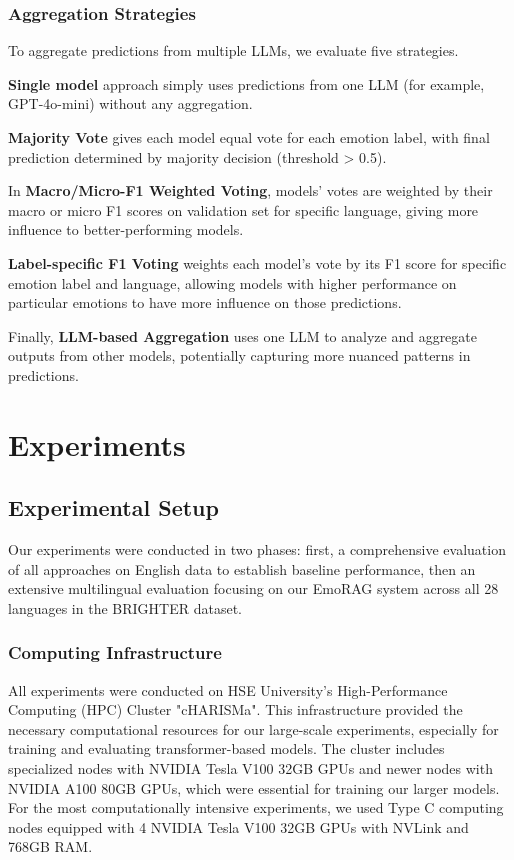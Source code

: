 \documentclass[a4paper,12pt]{extarticle}
\begin{document}
\subsubsection{Aggregation Strategies}

To aggregate predictions from multiple LLMs, we evaluate five strategies. 

\textbf{Single model} approach simply uses predictions from one LLM (for example, GPT-4o-mini) without any aggregation. 

\textbf{Majority Vote} gives each model equal vote for each emotion label, with final prediction determined by majority decision (threshold > 0.5). 

In \textbf{Macro/Micro-F1 Weighted Voting}, models' votes are weighted by their macro or micro F1 scores on validation set for specific language, giving more influence to better-performing models. 

\textbf{Label-specific F1 Voting} weights each model's vote by its F1 score for specific emotion label and language, allowing models with higher performance on particular emotions to have more influence on those predictions. 

Finally, \textbf{LLM-based Aggregation} uses one LLM to analyze and aggregate outputs from other models, potentially capturing more nuanced patterns in predictions.

\section{Experiments}

\subsection{Experimental Setup}

Our experiments were conducted in two phases: first, a comprehensive evaluation of all approaches on English data to establish baseline performance, then an extensive multilingual evaluation focusing on our EmoRAG system across all 28 languages in the BRIGHTER dataset.

\subsubsection{Computing Infrastructure}

All experiments were conducted on HSE University's High-Performance Computing (HPC) Cluster "cHARISMa". This infrastructure provided the necessary computational resources for our large-scale experiments, especially for training and evaluating transformer-based models. The cluster includes specialized nodes with NVIDIA Tesla V100 32GB GPUs and newer nodes with NVIDIA A100 80GB GPUs, which were essential for training our larger models. For the most computationally intensive experiments, we used Type C computing nodes equipped with 4 NVIDIA Tesla V100 32GB GPUs with NVLink and 768GB RAM.
\end{document}
